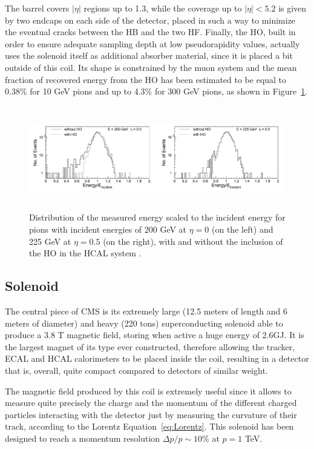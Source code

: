 \documentclass[a4paper, 10pt, openright]{report}
\begin{document}
The barrel covers $|\eta|$ regions up to 1.3, while the coverage up to $|\eta| < 5.2$ is given by two endcaps on each side of the detector, placed in such a way to minimize the eventual cracks between the HB and the two HF. Finally, the \ac{HO}, built in order to ensure adequate sampling depth at low pseudorapidity values, actually uses the solenoid itself as additional absorber material, since it is placed a bit outside of this coil. Its shape is constrained by the muon system and the mean fraction of recovered energy from the \ac{HO} has been estimated to be equal to 0.38\% for 10 GeV pions and up to 4.3\% for 300 GeV pions, as shown in Figure~\ref{fig:HOImpact}.

\begin{figure}[htbp]
\begin{center}
\includegraphics[width=15cm, height=4.5cm]{figs/HOImpact.png}
\caption{Distribution of the measured energy scaled to the incident energy for pions with incident energies of 200 GeV at $\eta = 0$ (on the left) and 225 GeV at $\eta = 0.5$ (on the right), with and without the inclusion of the \ac{HO} in the \ac{HCAL} system \cite{CMSDescription}.}
\label{fig:HOImpact}
\end{center}
\end{figure}

\subsection{Solenoid} \label{subsection:Solenoid}

The central piece of \ac{CMS} is its extremely large (12.5 meters of length and 6 meters of diameter) and heavy (220 tons) superconducting solenoid able to produce a 3.8 T magnetic field, storing when active a huge energy of 2.6GJ. It is the largest magnet of its type ever constructed, therefore allowing the tracker, \ac{ECAL} and \ac{HCAL} calorimeters to be placed inside the coil, resulting in a detector that is, overall, quite compact compared to detectors of similar weight.

The magnetic field produced by this coil is extremely useful since it allows to measure quite precisely the charge and the momentum of the different charged particles interacting with the detector just by measuring the curvature of their track, according to the Lorentz Equation~\ref{eq:Lorentz}. This solenoid has been designed to reach a momentum resolution $\Delta p/p \sim 10$\% at $p = 1$ TeV. 
\end{document}

